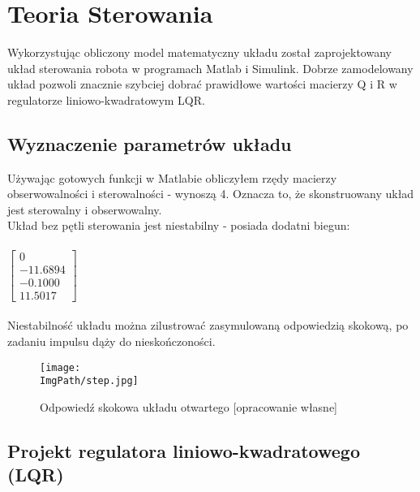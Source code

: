 \documentclass[a4paper,12pt,twoside,openany]{report}
\newcommand{\ImgPath}{.}
\begin{document}
\newpage

\chapter{Teoria Sterowania}

Wykorzystując obliczony model matematyczny układu został zaprojektowany układ sterowania robota w programach Matlab i Simulink. Dobrze zamodelowany układ pozwoli znacznie szybciej dobrać prawidłowe wartości macierzy Q i R w regulatorze liniowo-kwadratowym LQR.

\section{Wyznaczenie parametrów układu}

Używając gotowych funkcji w Matlabie obliczyłem rzędy macierzy obserwowalności i sterowalności - wynoszą 4. Oznacza to, że skonstruowany układ jest sterowalny i obserwowalny.\\
Układ bez pętli sterowania jest niestabilny - posiada dodatni biegun:\\
\\
$\begin{bmatrix}
0 \\
-11.6894\\
-0.1000\\
11.5017
\end{bmatrix}$
~\\
\\
\noindent Niestabilność układu można zilustrować zasymulowaną odpowiedzią skokową, po zadaniu impulsu dąży do nieskończoności.\\

\newpage

\begin{figure}[!htbp]
	\begin{center}
\centering
\texttt{[image: \\ImgPath/step.jpg]}
\end{center}
	\caption{Odpowiedź skokowa układu otwartego [opracowanie własne]}
	\label{schematKomunikacji}
\end{figure}

\section{Projekt regulatora liniowo-kwadratowego (LQR)}
\end{document}
